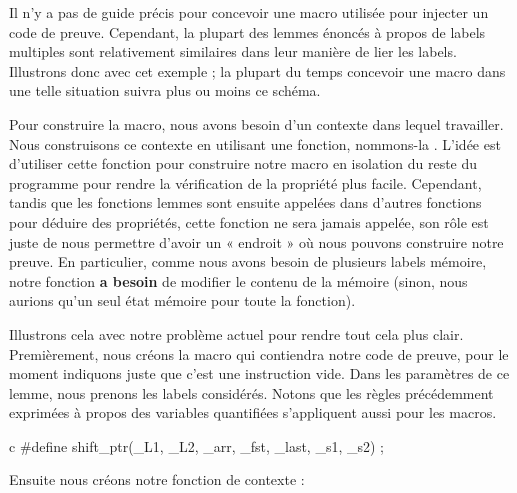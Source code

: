 Il n'y a pas de guide précis pour concevoir une macro utilisée pour injecter
un code de preuve. Cependant, la plupart des lemmes énoncés à propos de labels
multiples sont relativement similaires dans leur manière de lier les labels.
Illustrons donc avec cet exemple ; la plupart du temps concevoir une macro dans
une telle situation suivra plus ou moins ce schéma.


Pour construire la macro, nous avons besoin d'un contexte dans lequel travailler.
Nous construisons ce contexte en utilisant une fonction,
nommons-la . L'idée est d'utiliser
cette fonction pour construire notre macro en isolation du reste du programme pour
rendre la vérification de la propriété plus facile. Cependant, tandis que les
fonctions lemmes sont ensuite appelées dans d'autres fonctions pour déduire
des propriétés, cette fonction ne sera jamais appelée, son rôle est juste de nous
permettre d'avoir un « endroit » où nous pouvons construire notre preuve. En
particulier, comme nous avons besoin de plusieurs labels mémoire, notre fonction
\textbf{a besoin} de modifier le contenu de la mémoire (sinon, nous aurions qu'un
seul état mémoire pour toute la fonction).


Illustrons cela avec notre problème actuel pour rendre tout cela plus clair.
Premièrement, nous créons la macro  qui contiendra notre
code de preuve, pour le moment indiquons juste que c'est une instruction vide.
Dans les paramètres de ce lemme, nous prenons les labels considérés. Notons que
les règles précédemment exprimées à propos des variables quantifiées s'appliquent
aussi pour les macros.


\begin{CodeBlock}{c}
#define shift_ptr(_L1, _L2, _arr, _fst, _last, _s1, _s2) ;
\end{CodeBlock}


Ensuite nous créons notre fonction de contexte :




